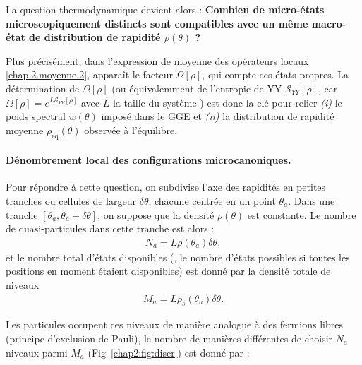 \medskip

La question thermodynamique devient alors : {\bf Combien de micro-états microscopiquement distincts sont compatibles avec un même macro-état de distribution de rapidité $\rho(\theta)$ ?} 

\medskip

Plus précisément, dans l’expression de moyenne des opérateurs locaux \eqref{chap.2.moyenne.2}, apparaît le facteur
\(
\Omega[\rho]
\),
qui compte ces états propres.  
La détermination de $\Omega[\rho]$ (ou équivalemment de l’entropie de \acrfull{YY} $\mathcal{S}_{YY}[\rho]$, car 
\(
\Omega[\rho] = e^{L\mathcal{S}_{YY}[\rho]}
\)
avec $L$ la taille du système
) est donc la clé pour relier \emph{(i)} le poids spectral $w(\theta)$ imposé dans le GGE et \emph{(ii)} la distribution de rapidité moyenne $\rho_{\mathrm{eq}}(\theta)$ observée à l’équilibre.

\paragraph{Dénombrement local des configurations microcanoniques.}
Pour répondre à cette question, on subdivise l’axe des rapidités en petites tranches ou cellules de largeur $\delta \theta$, chacune centrée en un point $\theta_a$. Dans une tranche $[\theta_a, \theta_a + \delta\theta]$, on suppose que la densité $\rho(\theta)$ est constante. Le nombre de quasi-particules dans cette tranche est alors :
\begin{eqnarray*}
	N_a = L\rho(\theta_a) \delta \theta,
\end{eqnarray*}
et le nombre total d'états disponibles (\ie, le nombre d’états possibles si toutes les positions en moment étaient disponibles) est donné par la densité totale de niveaux 
\begin{eqnarray*}
	M_a = L\rho_s(\theta_a) \delta \theta.
\end{eqnarray*}

Les particules occupent ces niveaux de manière analogue à des fermions libres (principe d’exclusion de Pauli), le nombre de manières différentes de choisir $N_a$ niveaux parmi $M_a$  (Fig~\ref{chap2:fig:discr}) est donné par :
	
